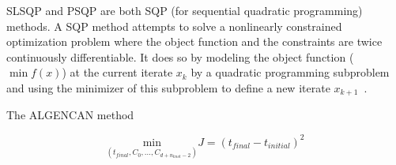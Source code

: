 SLSQP and PSQP are both SQP (for sequential quadratic programming) methods. A SQP method attempts to solve a nonlinearly constrained optimization problem where the object function and the constraints are twice continuously differentiable. It does so by modeling the object function ($\min f(x)$) at the current iterate $x_k$ by a quadratic programming subproblem and using the minimizer of this subproblem to define a new iterate $x_{k+1}$~\cite{Nocedal}.

The ALGENCAN method








\begin{equation}
	\underset{(t_{final},C_0,\dotsc,C_{d+n_{knot}-2})}{\mathrm{min}} J = (t_{final}-t_{initial})^{2}
\end{equation}

